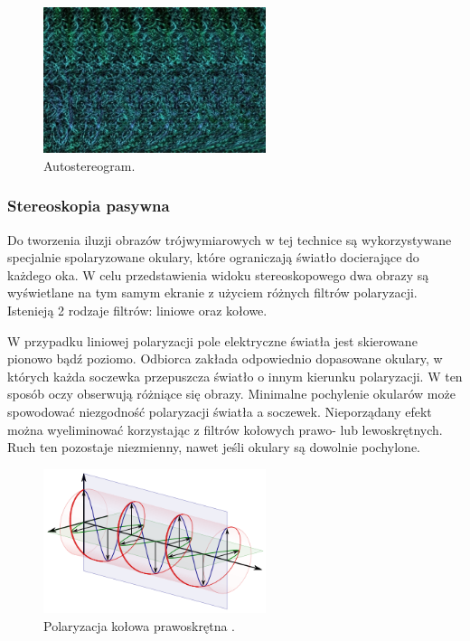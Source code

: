 \begin{figure}[H]
		\centering
 		\includegraphics[width=6.5cm]{68.jpg}
    	\caption{Autostereogram\cite{autostereogram}.}
 		\label{rys26}
\end{figure}

\subsubsection{Stereoskopia pasywna} 
Do tworzenia iluzji obrazów trójwymiarowych w tej technice są wykorzystywane specjalnie spolaryzowane okulary, które ograniczają światło docierające do każdego oka. W celu przedstawienia widoku stereoskopowego dwa obrazy są wyświetlane na tym samym ekranie z użyciem różnych filtrów polaryzacji. Istenieją 2 rodzaje filtrów: liniowe oraz kołowe.

W przypadku liniowej polaryzacji pole elektryczne światła jest skierowane pionowo bądź poziomo. Odbiorca zakłada odpowiednio dopasowane okulary, w których każda soczewka przepuszcza światło o innym kierunku polaryzacji. W ten sposób oczy obserwują różniące się obrazy. Minimalne pochylenie okularów może spowodować niezgodność polaryzacji światła a soczewek. Nieporządany efekt można wyeliminować korzystając z filtrów kołowych prawo- lub lewoskrętnych. Ruch ten pozostaje niezmienny, nawet jeśli okulary są dowolnie pochylone.

\begin{figure}[H]
		\centering
 		\includegraphics[width=6.5cm]{circular.png}
    	\caption{Polaryzacja kołowa prawoskrętna \cite{polarization}.}
 		\label{rys3}
\end{figure}

